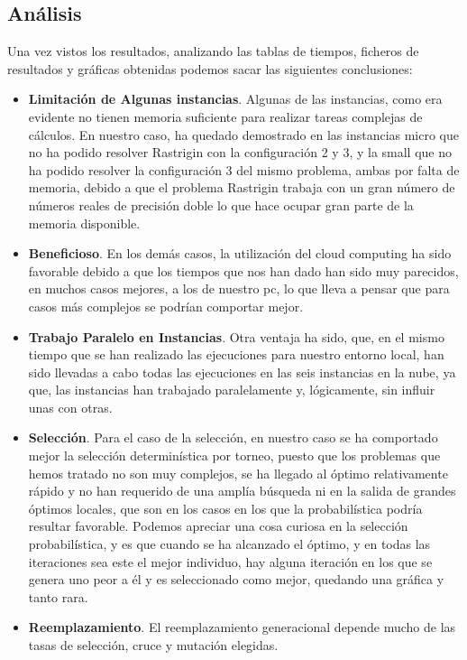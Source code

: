 \documentclass[runningheads]{llncs}
\begin{document}
\subsection{Análisis}
Una vez vistos los resultados, analizando las tablas de tiempos, ficheros de resultados y gráficas obtenidas 
podemos sacar las siguientes conclusiones:

\begin{itemize}
 \item \textbf{Limitación de Algunas instancias}. Algunas de las instancias, como era evidente no tienen memoria suficiente para realizar tareas complejas de cálculos. En 
 nuestro caso, ha quedado demostrado en las instancias micro que no ha podido resolver Rastrigin con la configuración 2 y 3, y 
 la small que no ha podido resolver la configuración 3 del mismo problema, ambas por falta de memoria, debido a que el problema 
 Rastrigin trabaja con un gran número de números reales de precisión doble lo que hace ocupar gran parte de la memoria disponible.
 \item \textbf{Beneficioso}. En los demás casos, la utilización del cloud computing ha sido favorable debido a que los tiempos que nos han dado 
 han sido muy parecidos, en muchos casos mejores, a los de nuestro pc, lo que lleva a pensar que para casos más complejos 
 se podrían comportar mejor.
 \item \textbf{Trabajo Paralelo en Instancias}. Otra ventaja ha sido, que, en el mismo tiempo que se han realizado las ejecuciones para nuestro entorno local, han sido 
 llevadas a cabo todas las ejecuciones en las seis instancias en la nube, ya que, las instancias han trabajado paralelamente y,
 lógicamente, sin influir unas con otras.
 \item \textbf{Selección}. Para el caso de la selección, en nuestro caso se ha comportado mejor la selección determinística por torneo, puesto que 
 los problemas que hemos tratado no son muy complejos, se ha llegado al óptimo relativamente rápido y no han requerido de una 
 amplía búsqueda ni en la salida de grandes óptimos locales, que son en los casos en los que la probabilística podría 
 resultar favorable. Podemos apreciar una cosa curiosa en la selección probabilística, y es que cuando se ha alcanzado el óptimo, 
 y en todas las iteraciones sea este el mejor individuo, hay alguna iteración en los que se genera uno peor a él y es seleccionado 
 como mejor, quedando una gráfica y tanto rara.
 \item \textbf{Reemplazamiento}. El reemplazamiento generacional depende mucho de las tasas de selección, cruce y mutación elegidas. 

\end{itemize}
\end{document}
